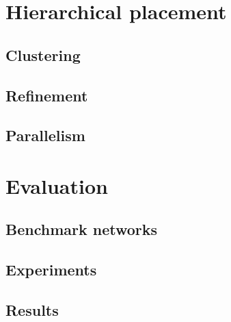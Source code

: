 \section{Hierarchical placement}
	\subsection{Clustering}
	\subsection{Refinement}
	\subsection{Parallelism}

\section{Evaluation}
	\subsection{Benchmark networks}
	\subsection{Experiments}
	\subsection{Results}

